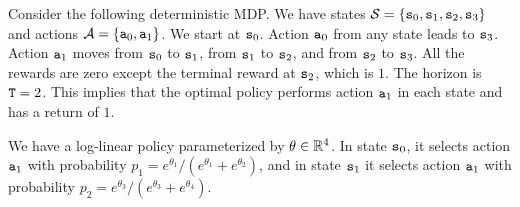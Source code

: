 \begin{example}
Consider the following deterministic MDP. We have states
$\mathcal{S}=\{{\tt s}_0,{\tt s}_1,{\tt s}_2,{\tt s}_3\}$ and actions
$\mathcal{A}=\{{\tt a}_0,{\tt a}_1\}$. We start at ${\tt s}_0$. Action
${\tt a}_0$ from any state leads to ${\tt s}_3$. Action ${\tt a}_1$
moves from ${\tt s}_0$ to ${\tt s}_1$, from ${\tt s}_1$ to ${\tt s}_2$, and from ${\tt s}_2$ to ${\tt s}_3$. All the rewards are zero except the terminal reward at
${\tt s}_2$, which is $1$. The horizon is ${\tt T}=2$. This implies
that the optimal policy performs action ${\tt a}_1$ in each state and has a return of $1$.

We have a log-linear policy parameterized by $\theta\in\mathbb{R}^4$. In
state ${\tt s}_0$, it selects action ${\tt a}_1$ with probability
$p_1=e^{\theta_1}/(e^{\theta_1}+e^{\theta_2})$, and in state
${\tt s}_1$ it selects action ${\tt a}_1$ with probability
$p_2=e^{\theta_3}/(e^{\theta_3}+e^{\theta_4})$.


\end{example}
